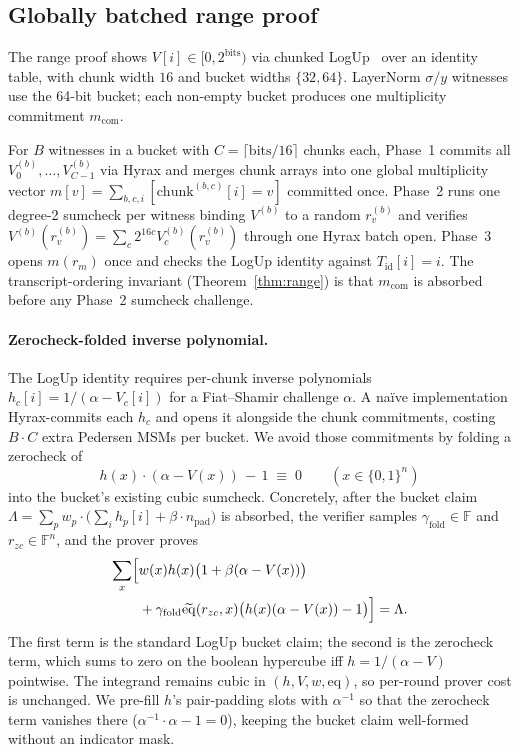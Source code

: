 \documentclass[letterpaper,twocolumn,10pt]{article}
\theoremstyle{remark}
\theoremstyle{definition}
\newcommand{\eq}{\widetilde{\mathrm{eq}}}
\begin{document}
\subsection{Globally batched range proof}
\label{ssec:range}
The range proof shows $V[i]\!\in\![0,2^{\mathrm{bits}})$ via chunked
LogUp~\cite{habo2024logup} over an identity table, with chunk width
$16$ and bucket widths $\{32,64\}$. LayerNorm $\sigma/y$ witnesses use
the 64-bit bucket; each non-empty bucket produces one multiplicity
commitment $m_{\mathrm{com}}$.

For $B$ witnesses in a bucket with
$C\!=\!\lceil\mathrm{bits}/16\rceil$ chunks each, Phase~1 commits all
$V^{(b)}_0,\dots,V^{(b)}_{C-1}$ via Hyrax and merges chunk arrays
into one global multiplicity vector
$m[v]\!=\!\sum_{b,c,i}[\mathrm{chunk}^{(b,c)}[i]\!=\!v]$ committed
once. Phase~2 runs one degree-2 sumcheck per witness binding $V^{(b)}$
to a random $r_v^{(b)}$ and verifies
$V^{(b)}(r_v^{(b)})\!=\!\sum_c 2^{16c}V^{(b)}_c(r_v^{(b)})$ through one
Hyrax batch open. Phase~3 opens $m(r_m)$ once and checks the LogUp
identity against $T_{\mathrm{id}}[i]\!=\!i$. The transcript-ordering
invariant (Theorem~\ref{thm:range}) is that $m_{\mathrm{com}}$ is
absorbed before any Phase~2 sumcheck challenge.

\paragraph{Zerocheck-folded inverse polynomial.}
The LogUp identity requires per-chunk inverse polynomials
$h_{c}[i]\!=\!1/(\alpha-V_{c}[i])$ for a Fiat--Shamir challenge $\alpha$.
A na\"ive implementation Hyrax-commits each $h_{c}$ and opens it
alongside the chunk commitments, costing $B\!\cdot\!C$ extra Pedersen
MSMs per bucket. We avoid those commitments by folding a zerocheck of
\[
  h(x)\cdot(\alpha-V(x))\,-\,1\;\equiv\;0\qquad(x\!\in\!\{0,1\}^{n})
\]
into the bucket's existing cubic sumcheck. Concretely, after the
bucket claim
$\Lambda\!=\!\sum_p w_p\!\cdot\!\bigl(\sum_i h_p[i]+\beta\!\cdot\!n_{\mathrm{pad}}\bigr)$
is absorbed, the verifier samples $\gamma_{\mathrm{fold}}\!\in\!\mathbb{F}$
and $r_{zc}\!\in\!\mathbb{F}^{n}$, and the prover proves
\begin{align*}
  \sum_x \Bigl[
    &w(x)h(x)\bigl(1+\beta(\alpha-V(x))\bigr) \\
    &+\gamma_{\mathrm{fold}}\eq(r_{zc},x)
      \bigl(h(x)(\alpha-V(x))-1\bigr)
  \Bigr]
  = \Lambda .
\end{align*}
The first term is the standard LogUp bucket claim; the second is the
zerocheck term, which sums to zero on the boolean hypercube iff
$h\!=\!1/(\alpha-V)$ pointwise. The integrand remains cubic in
$(h,V,w,\mathrm{eq})$, so per-round prover cost is unchanged. We
pre-fill $h$'s pair-padding slots with $\alpha^{-1}$ so that the
zerocheck term vanishes there ($\alpha^{-1}\!\cdot\!\alpha-1\!=\!0$),
keeping the bucket claim well-formed without an indicator mask.
\end{document}
